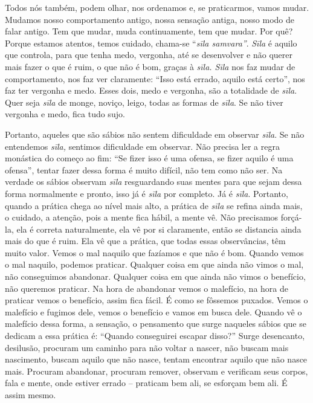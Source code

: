 Todos nós também, podem olhar, nos ordenamos e, se praticarmos,
vamos mudar. Mudamos nosso comportamento antigo, nossa sensação antiga,
nosso modo de falar antigo. Tem que mudar, muda continuamente, tem que
mudar. Por quê? Porque estamos atentos, temos cuidado, chama-se
“\textit{sīla samvara”}. \textit{Sīla} é aquilo que controla,
para que tenha medo, vergonha, até se desenvolver e não querer mais
fazer o que é ruim, o que não é bom, graças à \textit{sīla. Sīla}
nos faz mudar de comportamento, nos faz ver claramente: “Isso está
errado, aquilo está certo”, nos faz ter vergonha e medo. Esses dois,
medo e vergonha, são a totalidade de \textit{sīla}. Quer seja
\textit{sīla} de monge, noviço, leigo, todas as formas de
\textit{sīla}. Se não tiver vergonha e medo, fica tudo sujo. 

Portanto, aqueles que são sábios não sentem dificuldade em observar
\textit{sīla}. Se não entendemos \textit{sīla,} sentimos
dificuldade em observar. Não precisa ler a regra monástica do começo ao
fim: “Se fizer isso é uma ofensa, se fizer aquilo é uma ofensa”, tentar
fazer dessa forma é muito difícil, não tem como não ser. Na verdade os
sábios observam \textit{sīla} resguardando suas mentes para que
sejam dessa forma normalmente e pronto, isso já é \textit{sīla} por
completo. Já é \textit{sīla}. Portanto, quando a prática chega ao
nível mais alto, a prática de \textit{sīla} se refina ainda mais, o
cuidado, a atenção, pois a mente fica hábil, a mente vê. Não precisamos
forçá-la, ela é correta naturalmente, ela vê por si claramente, então
se distancia ainda mais do que é ruim. Ela vê que a prática, que todas
essas observâncias, têm muito valor. Vemos o mal naquilo que fazíamos e
que não é bom. Quando vemos o mal naquilo, podemos praticar. Qualquer
coisa em que ainda não vimos o mal, não conseguimos abandonar. Qualquer
coisa em que ainda não vimos o benefício, não queremos praticar. Na
hora de abandonar vemos o malefício, na hora de praticar vemos o
benefício, assim fica fácil. É como se fôssemos puxados. Vemos o
malefício e fugimos dele, vemos o benefício e vamos em busca dele.
Quando vê o malefício dessa forma, a sensação, o pensamento que surge
naqueles sábios que se dedicam a essa prática é: “Quando conseguirei
escapar disso?” Surge desencanto, desilusão, procuram um caminho para
não voltar a nascer, não buscam mais nascimento, buscam aquilo que não
nasce, tentam encontrar aquilo que não nasce mais. Procuram abandonar,
procuram remover, observam e verificam seus corpos, fala e mente, onde
estiver errado – praticam bem ali, se esforçam bem ali. É assim mesmo. 

